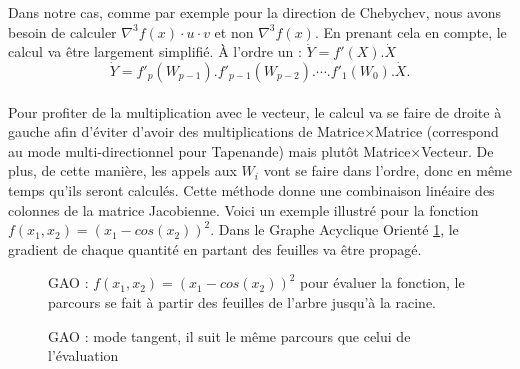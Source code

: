 \label{chap2:tangent}
Dans notre cas, comme par exemple pour la direction de Chebychev, nous avons besoin de calculer $\nabla^3f(x)\cdot u\cdot v$ et non $\nabla^3f(x)$.
 En prenant cela en compte, le calcul va être largement simplifi\'e. \`A l'ordre un : $\dot{Y}=f'(X).\dot{X}$
$$\dot{Y}=f'_p(W_{p-1}) . f'_{p-1}(W_{p-2}) . \cdots .f'_1(W_0).\dot{X}.$$\\
Pour profiter de la multiplication avec le vecteur, le calcul va se faire de droite \`a gauche afin d'\'eviter d'avoir des multiplications de 
Matrice$\times$Matrice (correspond au mode multi-directionnel pour Tapenande) mais plut\^ot Matrice$\times$Vecteur. De plus, de cette mani\`ere, les appels aux $W_i$ vont
se faire dans l'ordre, donc en même temps qu'ils seront calcul\'es. Cette m\'ethode donne une combinaison lin\'eaire des 
colonnes de la matrice Jacobienne.
Voici un exemple illustr\'e pour la fonction $f(x_1,x_2)=(x_1-cos(x_2))^2$. Dans le Graphe Acyclique Orient\'e \ref{fig:gao}, le 
gradient de chaque quantit\'e en partant des feuilles va être propag\'e.


\begin{figure}
\caption{GAO : $f(x_1,x_2)=(x_1-cos(x_2))^2$ pour \'evaluer la fonction, le parcours se fait 
\`a partir des feuilles de l'arbre jusqu'\`a la racine.}
\begin{center}
\end{center}
\label{fig:gao}
\end{figure}












\begin{figure}
\caption{GAO : mode tangent, il suit le même parcours que celui de l'\'evaluation}
\begin{center}
\end{center}
\label{fig:modetangent}
\end{figure}



